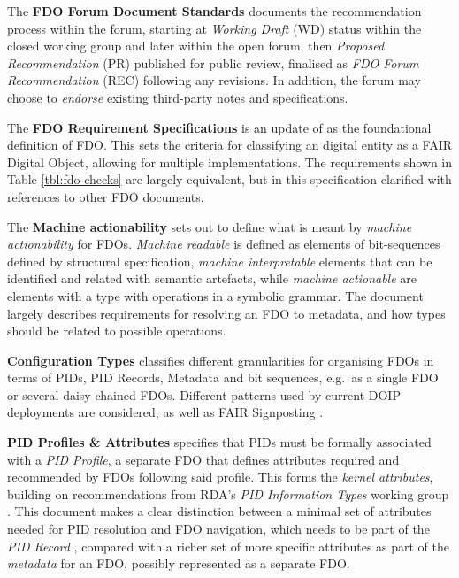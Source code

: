 \documentclass[fleqn,10pt,lineno]{wlpeerjlua}
\begin{document}
The \textbf{FDO Forum Document Standards} \autocite{fdo-DocProcessStd} documents the recommendation process within the forum, starting at \emph{Working Draft} (WD) status within the closed working group and later within the open forum, then \emph{Proposed Recommendation} (PR) published for public review, finalised as \emph{FDO Forum Recommendation} (REC) following any revisions. In addition, the forum may choose to \emph{endorse} existing third-party notes and specifications.

The \textbf{FDO Requirement Specifications} \autocite{fdo-RequirementSpec} is an update of \autocite{boninoFAIRDigitalObject} as the foundational definition of FDO. This sets the criteria for classifying an digital entity as a FAIR Digital Object, allowing for multiple implementations. The requirements shown in Table \vref{tbl:fdo-checks} are largely equivalent, but in this specification clarified with references to other FDO documents.

The \textbf{Machine actionability} \autocite{fdo-MachineActionDef} sets out to define what is meant by \emph{machine actionability} for FDOs. \emph{Machine readable} is defined as elements of bit-sequences defined by structural specification, \emph{machine interpretable} elements that can be identified and related with semantic artefacts, while \emph{machine actionable} are elements with a type with operations in a symbolic grammar. The document largely describes requirements for resolving an FDO to metadata, and how types should be related to possible operations.

\textbf{Configuration Types} \autocite{fdo-ConfigurationTypes} classifies different granularities for organising FDOs in terms of PIDs, PID Records, Metadata and bit sequences, e.g.~as a single FDO or several daisy-chained FDOs. Different patterns used by current DOIP deployments are considered, as well as FAIR Signposting \autocite{vandesompel2015,vandesompelFAIRSignpostingProfile2022}.

\textbf{PID Profiles \& Attributes} \autocite{fdo-PIDProfileAttributes} specifies that PIDs must be formally associated with a \emph{PID Profile}, a separate FDO that defines attributes required and recommended by FDOs following said profile. This forms the \emph{kernel attributes}, building on recommendations from RDA's \emph{PID Information Types} working group \autocite{weigelRDARecommendationPID2018}. This document makes a clear distinction between a minimal set of attributes needed for PID resolution and FDO navigation, which needs to be part of the \emph{PID Record} \autocite{islam_2023}, compared with a richer set of more specific attributes as part of the \emph{metadata} for an FDO, possibly represented as a separate FDO.
\end{document}

